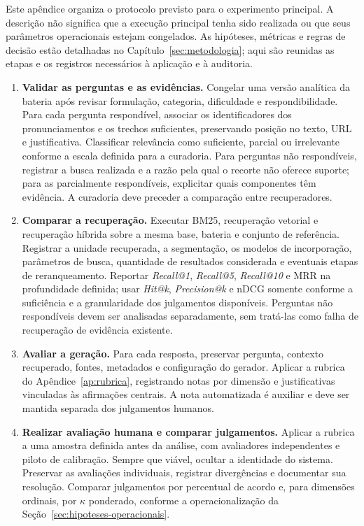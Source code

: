 
Este apêndice organiza o protocolo previsto para o experimento principal. A descrição não significa que a execução principal tenha sido realizada ou que seus parâmetros operacionais estejam congelados. As hipóteses, métricas e regras de decisão estão detalhadas no Capítulo~\ref{sec:metodologia}; aqui são reunidas as etapas e os registros necessários à aplicação e à auditoria.

\begin{enumerate}
  \item \textbf{Validar as perguntas e as evidências.} Congelar uma versão analítica da bateria após revisar formulação, categoria, dificuldade e respondibilidade. Para cada pergunta respondível, associar os identificadores dos pronunciamentos e os trechos suficientes, preservando posição no texto, URL e justificativa. Classificar relevância como suficiente, parcial ou irrelevante conforme a escala definida para a curadoria. Para perguntas não respondíveis, registrar a busca realizada e a razão pela qual o recorte não oferece suporte; para as parcialmente respondíveis, explicitar quais componentes têm evidência. A curadoria deve preceder a comparação entre recuperadores.
  \item \textbf{Comparar a recuperação.} Executar BM25, recuperação vetorial e recuperação híbrida sobre a mesma base, bateria e conjunto de referência. Registrar a unidade recuperada, a segmentação, os modelos de incorporação, parâmetros de busca, quantidade de resultados considerada e eventuais etapas de reranqueamento. Reportar \textit{Recall@1}, \textit{Recall@5}, \textit{Recall@10} e MRR na profundidade definida; usar \textit{Hit@k}, \textit{Precision@k} e nDCG somente conforme a suficiência e a granularidade dos julgamentos disponíveis. Perguntas não respondíveis devem ser analisadas separadamente, sem tratá-las como falha de recuperação de evidência existente.
  \item \textbf{Avaliar a geração.} Para cada resposta, preservar pergunta, contexto recuperado, fontes, metadados e configuração do gerador. Aplicar a rubrica do Apêndice~\ref{ap:rubrica}, registrando notas por dimensão e justificativas vinculadas às afirmações centrais. A nota automatizada é auxiliar e deve ser mantida separada dos julgamentos humanos.
  \item \textbf{Realizar avaliação humana e comparar julgamentos.} Aplicar a rubrica a uma amostra definida antes da análise, com avaliadores independentes e piloto de calibração. Sempre que viável, ocultar a identidade do sistema. Preservar as avaliações individuais, registrar divergências e documentar sua resolução. Comparar julgamentos por percentual de acordo e, para dimensões ordinais, por $\kappa$ ponderado, conforme a operacionalização da Seção~\ref{sec:hipoteses-operacionais}.

\end{enumerate}
